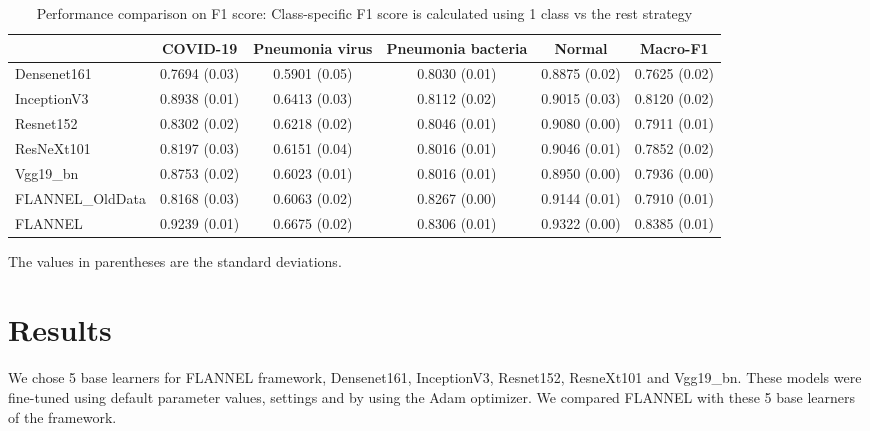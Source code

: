 \documentclass{sigkddExp}
\begin{document}
\begin{table}
    \centering
    \caption{Performance comparison on F1 score: Class-specific F1 score is calculated using 1 class vs the rest strategy}
    \label{table:resultstats}
    \begin{tabular}{ lccccc } \hline
                         & COVID-19      & Pneumonia virus & Pneumonia bacteria &
        Normal           & Macro-F1                                               \\ \hline

        Densenet161      & 0.7694 (0.03) & 0.5901 (0.05)   & 0.8030 (0.01)      &
        0.8875 (0.02)    & 0.7625 (0.02)                                          \\
        InceptionV3      & 0.8938 (0.01) & 0.6413 (0.03)   & 0.8112 (0.02)      &
        0.9015 (0.03)    & 0.8120 (0.02)                                          \\
        Resnet152        & 0.8302 (0.02) & 0.6218 (0.02)   & 0.8046 (0.01)      &
        0.9080 (0.00)    & 0.7911 (0.01)                                          \\
        ResNeXt101       & 0.8197 (0.03) & 0.6151 (0.04)   & 0.8016 (0.01)      &
        0.9046 (0.01)    & 0.7852 (0.02)                                          \\
        Vgg19\_bn        & 0.8753 (0.02) & 0.6023 (0.01)   & 0.8016 (0.01)      &
        0.8950 (0.00)    & 0.7936 (0.00)                                          \\
        FLANNEL\_OldData & 0.8168 (0.03) & 0.6063 (0.02)   & 0.8267 (0.00)      &
        0.9144 (0.01)    & 0.7910 (0.01)                                          \\
        FLANNEL          & 0.9239 (0.01) & 0.6675 (0.02)   & 0.8306 (0.01)      &
        0.9322 (0.00)    & 0.8385 (0.01)                                          \\ \hline
    \end{tabular}\par
    \bigskip
    The values in parentheses are the standard deviations.
\end{table}

\section{Results}

We chose 5 base learners for FLANNEL framework, Densenet161, InceptionV3,
Resnet152, ResneXt101 and Vgg19\_bn. These models were fine-tuned using default
parameter values, settings and by using the Adam optimizer. We compared FLANNEL
with these 5 base learners of the framework.
\end{document}
